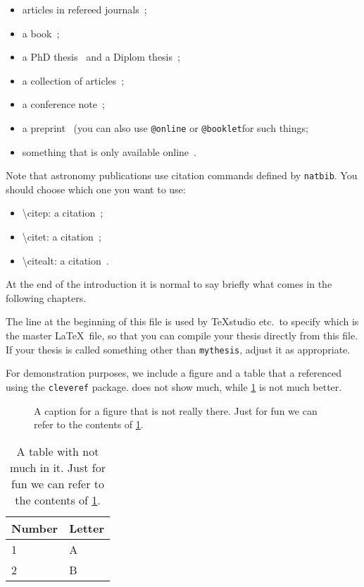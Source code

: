 \begin{itemize}
\item articles in refereed journals~\citep{pdg2010,Aad:2010ey};
\item a book~\citep{Halzen:1984mc};
\item a PhD thesis~\citep{tlodd:2012} and a Diplom thesis~\citep{mergelmeyer:2011};
\item a collection of articles~\citep{lhc:vol1};
\item a conference note~\citep{ATLAS-CONF-2011-008};
\item a preprint~\citep{atlas:perf:2009} (you can also use
  \texttt{@online} or \texttt{@booklet}for such things;
\item something that is only available online~\citep{thesis-guide}.
\end{itemize}
Note that astronomy publications use citation commands defined by \texttt{natbib}.
You should choose which one you want to use:
\begin{itemize}
\item \textbackslash citep: a citation~\citep{pdg2010,Aad:2010ey};
\item \textbackslash citet: a citation~\citet{pdg2010,Aad:2010ey};
\item \textbackslash citealt: a citation~\citealt{pdg2010,Aad:2010ey}.
\end{itemize}

At the end of the introduction it is normal to say briefly what comes
in the following chapters.

The line at the beginning of this file is used by TeXstudio etc.\ to
specify which is the master \LaTeX\ file, so that you can compile your thesis
directly from this file.
If your thesis is called something other than \texttt{mythesis}, adjust it as appropriate.

For demonstration purposes,
we include a figure and a table that a referenced using the \texttt{cleveref} package.
 does not show much,
while \cref{tab:little} is not much better.

\begin{figure}[htbp]
  \centering
  \fbox{\textcolor{red}{This is not really a figure!}}
  \caption{A caption for a figure that is not really there.
    Just for fun we can refer to the contents of \cref{tab:little}.}
  \label{fig:nothing}
\end{figure}

\begin{table}[htbp]
  \caption{A table with not much in it.
    Just for fun we can refer to the contents of \cref{fig:nothing}.}
  \label{tab:little}
  \centering
  \begin{tabular}{ll}
    \toprule
    Number & Letter \\
    \midrule
    1 & A \\
    2 & B \\
    \bottomrule  
  \end{tabular}
\end{table}

